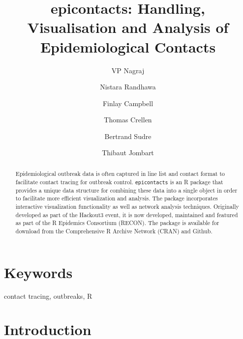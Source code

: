 \documentclass[9pt,a4paper,]{extarticle}
\theoremstyle{definition}
\theoremstyle{definition}
\theoremstyle{definition}
\theoremstyle{remark}
\begin{document}
\pagestyle{front}

\title{epicontacts: Handling, Visualisation and Analysis of Epidemiological Contacts}

\author[1]{VP Nagraj}
\author[2]{Nistara Randhawa}
\author[3]{Finlay Campbell}
\author[4]{Thomas Crellen}
\author[5]{Bertrand Sudre}
\author[3]{Thibaut Jombart}

\maketitle
\thispagestyle{front}

\begin{abstract}
Epidemiological outbreak data is often captured in line list and contact format to facilitate contact tracing for outbreak control. \texttt{epicontacts} is an R package that provides a unique data structure for combining these data into a single object in order to facilitate more efficient visualization and analysis. The package incorporates interactive visualization functionality as well as network analysis techniques. Originally developed as part of the Hackout3 event, it is now developed, maintained and featured as part of the R Epidemics Consortium (RECON). The package is available for download from the Comprehensive R Archive Network (CRAN) and Github.
\end{abstract}

\section*{Keywords}
contact tracing, outbreaks, R


\clearpage
\pagestyle{main}

\section{Introduction}\label{introduction}
\end{document}
